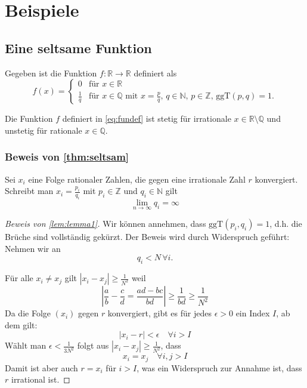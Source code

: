 
\chapter{Beispiele}
\section{Eine seltsame Funktion}\label{sec:math}

Gegeben ist die Funktion $f: \mathbb{R} \to \mathbb{R}$ definiert als
\begin{equation}\label{eq:fundef}
	f(x) = \left\{
		\begin{array}{ll}
			0 & \text{für } x \in \mathbb{R} \\
			\frac{1}{q} & \text{für } x \in \mathbb{Q} \text{ mit }
			x=\frac{p}{q},\, q \in \mathbb{N},\, p \in \mathbb{Z},\,
			\text{ggT}(p,q)=1.
		\end{array} \right.
\end{equation}

\begin{thm}\label{thm:seltsam}
Die Funktion $f$ definiert in \autoref{eq:fundef} ist stetig für
irrationale $x \in \mathbb{R}\setminus \mathbb{Q}$ und unstetig für 
rationale $x \in \mathbb{Q}$.
\end{thm}

\subsection{Beweis von \autoref{thm:seltsam}}

\begin{lem}\label{lem:lemma1}
Sei $x_i$ eine Folge rationaler Zahlen, die gegen eine
	irrationale Zahl $r$ konvergiert. Schreibt man 
	$x_i=\frac{p_i}{q_i}$ mit 
	$p_i \in \mathbb{Z}$ und $q_i \in \mathbb{N}$ gilt
	\[
		\lim_{n \to \infty} q_i = \infty
	\]
\end{lem}

\begin{proof}[Beweis von \autoref{lem:lemma1}]

	Wir können annehmen, dass $\text{ggT}(p_i, q_i)=1$, d.h.
	die Brüche sind vollständig gekürzt. Der Beweis 
	wird durch Widerspruch geführt: Nehmen wir an 
	\[
		q_i<N\, \forall i.
	\]

	Für alle $x_i \neq x_j$ gilt $|x_i - x_j| \geq \frac{1}{N^2}$ weil
	\[
		\left|\frac{a}{b} - \frac{c}{d} = \frac{ad-bc}{bd}\right| \geq
		\frac{1}{bd} \geq \frac{1}{N^2}
	\]
	Da die Folge $(x_i)$ gegen $r$ konvergiert, gibt es für jedes $\epsilon>0$
	ein Index $I$, ab dem gilt:
	\[
		|x_i-r|<\epsilon \quad \forall i>I
	\]
	Wählt man $\epsilon<\frac{1}{3N^2}$ folgt aus $|x_i - x_j| \geq
	\frac{1}{N^2}$,
	dass 
	\[
		x_i = x_j \quad \forall i,j > I
	\]
	Damit ist aber auch $r=x_i$ für $i>I$, was ein Widerspruch zur Annahme ist,
	dass $r$ irrational ist.
	
\end{proof}


